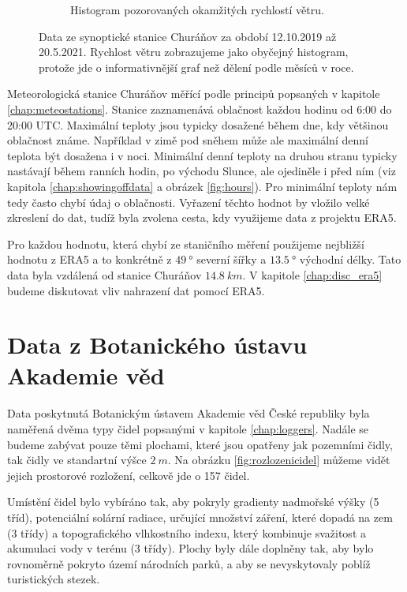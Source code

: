 \begin{figure}
\begin{subfigure}{0.45\textwidth}
		\caption{Histogram pozorovaných okamžitých rychlostí větru.}
		\label{fig:synop_ffkmh}
	\end{subfigure}
	\caption{Data ze synoptické stanice Churáňov za období 12.10.2019 až 20.5.2021. Rychlost větru zobrazujeme jako obyčejný histogram, protože jde o informativnější graf než dělení podle měsíců v roce.}
	\label{fig:chmuukazka}
\end{figure}

Meteorologická stanice Churáňov měřící podle principů popsaných v kapitole \ref{chap:meteostations}. Stanice zaznamenává oblačnost každou hodinu od 6:00 do 20:00 UTC. Maximální teploty jsou typicky dosažené během dne, kdy většinou oblačnost známe. Například v zimě pod sněhem může ale maximální denní teplota být dosažena i v noci. Minimální denní teploty na druhou stranu typicky nastávají během ranních hodin, po východu Slunce, ale ojediněle i před ním (viz kapitola \ref{chap:showingoffdata} a obrázek \ref{fig:hours}). Pro minimální teploty nám tedy často chybí údaj o oblačnosti. Vyřazení těchto hodnot by vložilo velké zkreslení do dat, tudíž byla zvolena cesta, kdy využijeme data z projektu ERA5.

Pro každou hodnotu, která chybí ze staničního měření použijeme nejbližší hodnotu z ERA5 a to konkrétně z $\SI{49}{\degree}$ severní šířky a $\SI{13.5}{\degree}$ východní délky. Tato data byla vzdálená od stanice Churáňov $\SI{14.8}{km}$. V kapitole \ref{chap:disc_era5} budeme diskutovat vliv nahrazení dat pomocí ERA5.

\section{Data z Botanického ústavu Akademie věd}\label{chap:data_buav}
Data poskytnutá Botanickým ústavem Akademie věd České republiky byla naměřená dvěma typy čidel popsanými v kapitole \ref{chap:loggers}. Nadále se budeme zabývat pouze těmi plochami, které jsou opatřeny jak pozemními čidly, tak čidly ve standartní výšce $\SI{2}{m}$. Na obrázku \ref{fig:rozlozenicidel} můžeme vidět jejich prostorové rozložení, celkově jde o 157 čidel. 

Umístění čidel bylo vybíráno tak, aby pokryly gradienty nadmořské výšky (5 tříd), potenciální solární radiace, určující množství záření, které dopadá na zem (3 třídy) a topografického vlhkostního indexu, který kombinuje svažitost a akumulaci vody v terénu (3 třídy). Plochy byly dále doplněny tak, aby bylo rovnoměrně pokryto území národních parků, a aby se nevyskytovaly poblíž turistických stezek.

